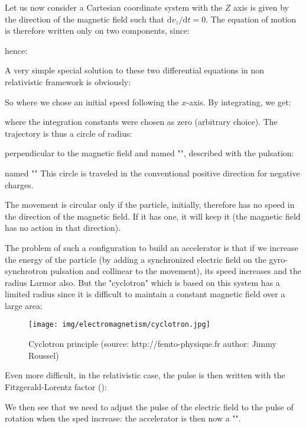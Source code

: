 	Let us now consider a Cartesian coordinate system with the $Z$ axis is given by the direction of the magnetic field such that $\mathrm{d}v_z/\mathrm{d}t=0$. The equation of motion is therefore written only on two components, since:
	
	hence:
	
	A very simple special solution to these two differential equations in non relativistic framework is obviously:
	
	So where we chose an initial speed following the $x$-axis. By integrating, we get:
	
	where the integration constants were chosen as zero (arbitrary choice). The trajectory is thus a circle of radius:
	
	perpendicular to the magnetic field and named "", described with the pulsation:
	
	named "" This circle is traveled in the conventional positive direction for negative charges.
	\begin{tcolorbox}[title=Remark,colframe=black,arc=10pt]
	The movement is circular only if the particle, initially, therefore has no speed in the direction of the magnetic field. If it has one, it will keep it (the magnetic field has no action in that direction).
	\end{tcolorbox}
	The problem of such a configuration to build an accelerator is that if we increase the energy of the particle (by adding a synchronized electric field on the gyro-synchrotron pulsation and collinear to the movement), its speed increases and the radius Larmor also. But the "cyclotron" which is based on this system has a limited radius since it is difficult to maintain a constant magnetic field over a large area:
	\begin{figure}[H]
		\centering
		\texttt{[image: img/electromagnetism/cyclotron.jpg]}
		\caption[Cyclotron principle]{Cyclotron principle (source:  http://femto-physique.fr author: Jimmy Roussel)}
	\end{figure}

	Even more difficult, in the relativistic case, the pulse is then written with the Fitzgerald-Lorentz factor ():
	
	We then see that we need to adjust the pulse of the electric field to the pulse of rotation when the sped increase: the accelerator is then now a "".
	
